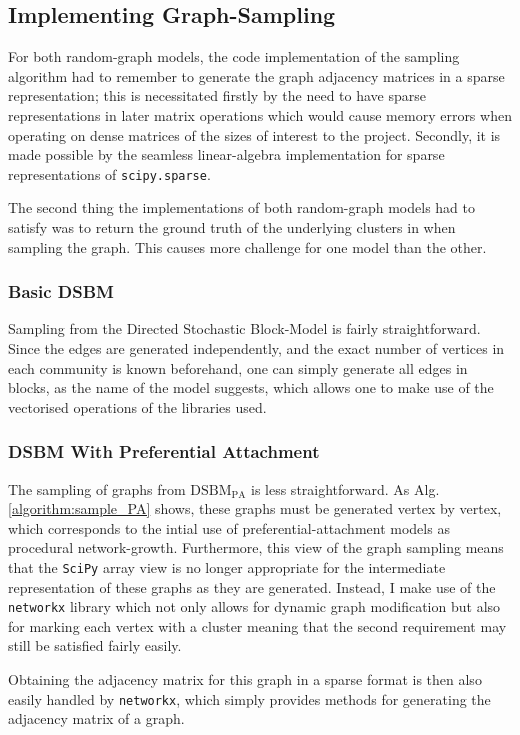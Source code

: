 \subsection{Implementing Graph-Sampling}

For both random-graph models, the code implementation of the sampling algorithm had to remember 
to generate the graph adjacency matrices in a sparse representation; this is necessitated firstly by
the need to have sparse representations in later matrix operations which would cause memory errors
when operating on dense matrices of the sizes of interest to the project. Secondly, it is made 
possible by the seamless linear-algebra implementation for sparse representations of 
\texttt{scipy.sparse}.

The second thing the implementations of both random-graph models had to satisfy was to return the
ground truth of the underlying clusters in when sampling the graph. This causes more challenge 
for one model than the other.

\subsubsection{Basic DSBM}
Sampling from the Directed Stochastic Block-Model is fairly straightforward. Since the edges are 
generated independently, and the exact number of vertices in each community is known beforehand,
one can simply generate all edges in blocks, as the name of the model suggests, which allows one 
to make use of the vectorised operations of the libraries used.

\subsubsection{DSBM With Preferential Attachment}
The sampling of graphs from $\mathrm{DSBM}_\mathrm{PA}$ is less straightforward. As Alg.\ %
\ref{algorithm:sample_PA} shows, these graphs must be generated vertex by vertex, which 
corresponds to the intial use of preferential-attachment models as procedural network-growth.
Furthermore, this view of the graph sampling means that the \texttt{SciPy} array view is no longer 
appropriate for the intermediate representation of these graphs as they are generated. Instead,
I make use of the \texttt{networkx} library which not only allows for dynamic graph modification 
but also for marking each vertex with a cluster meaning that the second requirement may still be
satisfied fairly easily. 

Obtaining the adjacency matrix for this graph in a sparse format is then also easily handled by 
\texttt{networkx}, which simply provides methods for generating the adjacency matrix of a graph.

